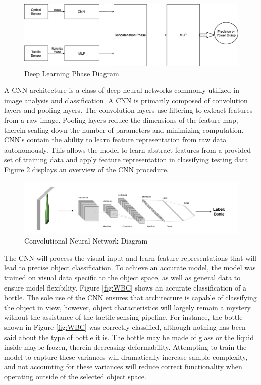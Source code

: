 \documentclass[11.5pt]{article}
\begin{document}
\begin{figure}[H]
    \centering
    \includegraphics[width=0.95\linewidth]{assets/CumFlow.png}
     \caption{Deep Learning Phase Diagram}
    \label{fig:cumflow}
\end{figure}

A CNN architecture is a class of deep neural networks commonly utilized in image analysis and classification. A CNN is primarily composed of convolution layers and pooling layers. The convolution layers use filtering to extract features from a raw image. Pooling layers reduce the dimensions of the feature map, therein scaling down the number of parameters and minimizing computation. CNN’s contain the ability to learn feature representation from raw data autonomously. This allows the model to learn abstract features from a provided set of training data and apply feature representation in classifying testing data. Figure \ref{fig:CNND} displays an overview of the CNN procedure.

\begin{figure}[H]
    \centering
    \includegraphics[width=1.02\textwidth]{assets/CNND.png}
    \caption{Convolutional Neural Network Diagram}
    \label{fig:CNND}
\end{figure}

The CNN will process the visual input and learn feature representations that will lead to precise object classification. To achieve an accurate model, the model was trained on visual data specific to the object space, as well as general data to ensure model flexibility. Figure \ref{fig:WBC} shows an accurate classification of a bottle. The sole use of the CNN ensures that architecture is capable of classifying the object in view, however, object characteristics will largely remain a mystery without the assistance of the tactile sensing pipeline. For instance, the bottle shown in Figure \ref{fig:WBC} was correctly classified, although nothing has been said about the type of bottle it is. The bottle may be made of glass or the liquid inside maybe frozen, therein decreasing deformability. Attempting to train the model to capture these variances will dramatically increase sample complexity, and not accounting for these variances will reduce correct functionality when operating outside of the selected object space.
\end{document}
